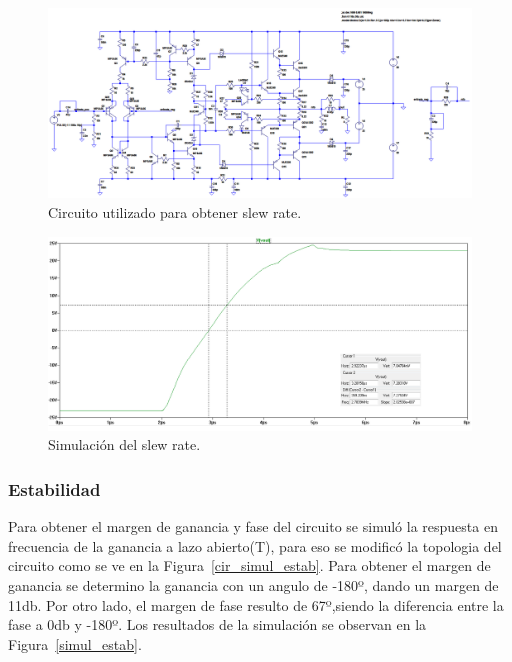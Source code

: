 \begin{figure}[H]
\centering
\includegraphics[width=1\textwidth]{img/slew_rate_cir.png}
\caption{Circuito utilizado para obtener slew rate.}
\label{cir_simul_slew_rate}
\end{figure}

\begin{figure}[H]
\centering
\centerline{\includegraphics[width=1\textwidth]{img/slew_rate.png}}
\caption{Simulación del slew rate.}
\label{simul_slew_rate}
\end{figure}

\medskip
\subsubsection{Estabilidad}

Para obtener el margen de ganancia y fase del circuito se simuló la respuesta en frecuencia de la ganancia a lazo abierto(T), para eso se modificó la topologia del circuito como se ve en la Figura~\ref{cir_simul_estab}. Para obtener el margen de ganancia se determino la ganancia con un angulo de -180º, dando un margen de 11db. Por otro lado, el margen de fase resulto de 67º,siendo la diferencia entre la fase a 0db y -180º.
Los resultados de la simulación se observan en la Figura~\ref{simul_estab}.

